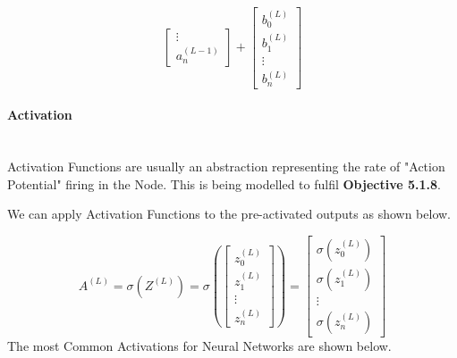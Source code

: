 \begin{flushleft}
\begin{center}
\[\begin{bmatrix}
                        \vdots      \\
                        a^{(L-1)}_{n} 
                        \end{bmatrix}
                        +
                        \begin{bmatrix}
                        b^{(L)}_{0} \\
                        b^{(L)}_{1} \\
                        \vdots      \\
                        b^{(L)}_{n} 
                        \end{bmatrix}
                        \]
                    \end{center}
                    \vspace{0.2cm}

                \paragraph{Activation} \mbox{} \\
                    \vspace{0.2cm}
                    Activation Functions are usually an abstraction representing the rate of "Action Potential" firing in the Node.
                    This is being modelled to fulfil \textbf{Objective 5.1.8}.
                    
                    \vspace{0.2cm}
                    We can apply Activation Functions to the pre-activated outputs as shown below.

                    \[
                    A^{(L)} = \sigma(Z^{(L)}) = \sigma\left(
                    \begin{bmatrix}
                    z^{(L)}_{0} \\
                    z^{(L)}_{1} \\
                    \vdots      \\
                    z^{(L)}_{n} 
                    \end{bmatrix}
                    \right)
                    =
                    \begin{bmatrix}
                    \sigma(z^{(L)}_{0}) \\
                    \sigma(z^{(L)}_{1}) \\
                    \vdots              \\
                    \sigma(z^{(L)}_{n}) 
                    \end{bmatrix}
                    \]
                    The most Common Activations for Neural Networks are shown below. \\

\end{flushleft}
